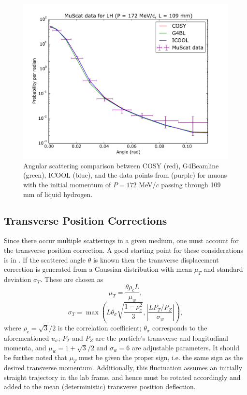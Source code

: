 \documentclass{jacow}
\begin{document}
\begin{figure}[htbf]
\centering
\includegraphics[width=\columnwidth]{scattering.pdf}
\caption{Angular scattering comparison between COSY (red), G4Beamline (green), ICOOL (blue), and the data points from \cite{Muscat} (purple) for muons with the initial momentum of $P=172$ MeV/$c$ passing through 109 mm of liquid hydrogen.}
\label{fig:scattering}
\end{figure}

\subsection{Transverse Position Corrections}
Since there occur multiple scatterings in a given medium, one must account for the transverse position correction. A good starting point for these considerations is in \cite{PDG}. If the scattered angle $\theta$ is known then the transverse displacement correction is generated from a Gaussian distribution with mean $\mu_T$ and standard deviation $\sigma_T$. These are chosen as 
\[
\mu_T = \frac{\theta \rho_c L}{\mu_w},
\]
\[
\sigma_T = \max\left(L \theta_\sigma \sqrt{\frac{1-\rho_c^2}{3}},\left|\frac{L P_T / P_Z}{\sigma_w}\right|\right),
\]
where $\rho_c = \sqrt{3}/2$ is the correlation coefficient; $\theta_\sigma$ corresponds to the aforementioned $u_\sigma$; $P_T$ and $P_Z$ are the particle's transverse and longitudinal momenta, and $\mu_w=1+\sqrt{3}/2$ and $\sigma_w=6$ are adjustable parameters. It should be further noted that $\mu_T$ must be given the proper sign, i.e. the same sign as the desired transverse momentum. Additionally, this fluctuation assumes an initially straight trajectory in the lab frame, and hence must be rotated accordingly and added to the mean (deterministic) transverse position deflection.
\end{document}
